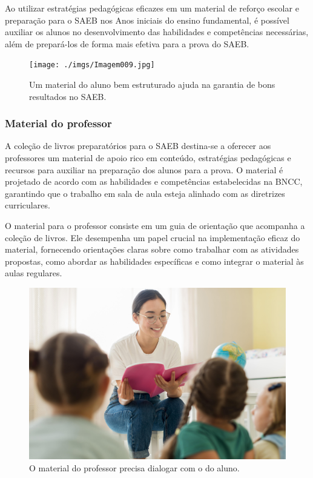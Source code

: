 Ao utilizar estratégias pedagógicas eficazes em um material de reforço
escolar e preparação para o SAEB nos Anos iniciais do ensino
fundamental, é possível auxiliar os alunos no desenvolvimento das
habilidades e competências necessárias, além de prepará-los de forma
mais efetiva para a prova do SAEB.

\begin{figure}
\centering
\texttt{[image: ./imgs/Imagem009.jpg]}
\caption{Um material do aluno bem estruturado ajuda na garantia de bons
resultados no SAEB.}
\end{figure}

\subsubsection{Material do professor}\label{material-do-professor}

A coleção de livros preparatórios para o SAEB destina-se a oferecer aos
professores um material de apoio rico em conteúdo, estratégias
pedagógicas e recursos para auxiliar na preparação dos alunos para a
prova. O material é projetado de acordo com as habilidades e
competências estabelecidas na BNCC, garantindo que o trabalho em sala de
aula esteja alinhado com as diretrizes curriculares.

O material para o professor consiste em um guia de orientação que
acompanha a coleção de livros. Ele desempenha um papel crucial na
implementação eficaz do material, fornecendo orientações claras sobre
como trabalhar com as atividades propostas, como abordar as habilidades
específicas e como integrar o material às aulas regulares.

\begin{figure}
\centering
\includegraphics[width=\textwidth]{./imgs/Imagem010.jpg}
\caption{O material do professor precisa dialogar com o do aluno.}
\end{figure}

